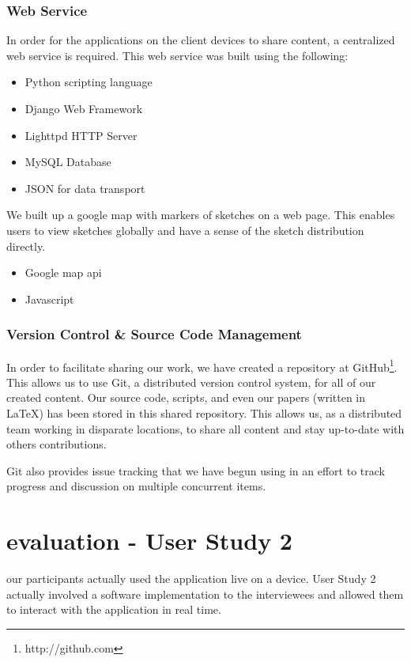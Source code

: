 \documentclass{chi2009}
\begin{document}
\subsubsection{Web Service}

In order for the applications on the client devices to share content, a
centralized web service is required. This web service was built using the following:

\begin{itemize}
\item Python scripting language
\item Django Web Framework
\item Lighttpd HTTP Server
\item MySQL Database
\item JSON for data transport
\end{itemize}

We built up a google map with markers of sketches on a web page. This enables
users to view sketches globally and have a sense of the sketch distribution
directly.

\begin{itemize}
\item Google map api
\item Javascript
\end{itemize}

\subsubsection{Version Control \& Source Code Management}

In order to facilitate sharing our work, we have created a repository at
GitHub\footnote{http://github.com}.  This allows us to use Git, a distributed
version control system, for all of our created content.  Our source code,
scripts, and even our papers (written in \LaTeX) has been stored in this shared
repository.  This allows us, as a distributed team working in disparate
locations, to share all content and stay up-to-date with others contributions.

Git also provides issue tracking that we have begun using in an effort to track
progress and discussion on multiple concurrent items.

\section{evaluation - User Study 2}
our participants actually used the application live on a device. User Study 2 actually involved a software implementation to the interviewees
and allowed them to interact with the application in real time.
\end{document}
